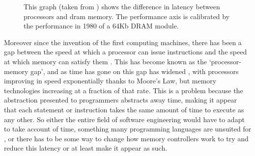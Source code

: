 
\begin{figure}
		
		\caption[Processor Memory Performance Gap]{This graph (taken from \cite{hennessyComputerArchitectureQuantitative2019}) shows the difference in latency between processors and \gls{dram} memory. The performance axis is calibrated by the performance in 1980 of a 64Kb DRAM module.}
		\label{fig:proc-mem-gap}
\end{figure}

Moreover since the invention of the first computing machines, there has been a gap between the speed at which a processor can issue instructions and the speed at which memory can satisfy them \cite{wilkesMemoryGapFuture2001}. This has become known as the `processor-memory gap', and as time has gone on this gap has widened \cite{pattersonComputerOrganizationDesign2018}, with processors improving in speed exponentially thanks to Moore's Law, but memory technologies increasing at a fraction of that rate. This is a problem because the abstraction presented to programmers abstracts away time, making it appear that each statement or instruction takes the same amount of time to execute as any other. So either the entire field of software engineering would have to adapt to take account of time, something many programming languages are unsuited for \cite{furiaModelingTimeComputing2010}, or there has to be some way to change how memory controllers work to try and reduce this latency or at least make it appear as such.

